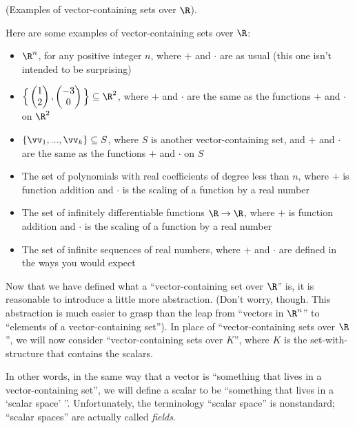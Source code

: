 \begin{remark}
    (Examples of vector-containing sets over $\R$).
    
    Here are some examples of vector-containing sets over $\R$:
    
    \begin{itemize}
        \item $\R^n$, for any positive integer $n$, where $+$ and $\cdot$ are as usual (this one isn't intended to be surprising)
        \item $\Big\{\begin{pmatrix} 1 \\ 2 \end{pmatrix}, \begin{pmatrix} -3 \\ 0 \end{pmatrix}\Big\} \subseteq \R^2$, where $+$ and $\cdot$ are the same as the functions $+$ and $\cdot$ on $\R^2$
        \item $\{\vv_1, ..., \vv_k\} \subseteq S$, where $S$ is another vector-containing set, and $+$ and $\cdot$ are the same as the functions $+$ and $\cdot$ on $S$
        \item The set of polynomials with real coefficients of degree less than $n$, where $+$ is function addition and $\cdot$ is the scaling of a function by a real number
        \item The set of infinitely differentiable functions $\R \rightarrow \R$, where $+$ is function addition and $\cdot$ is the scaling of a function by a real number
        \item The set of infinite sequences of real numbers, where $+$ and $\cdot$ are defined in the ways you would expect
    \end{itemize}
\end{remark}

Now that we have defined what a ``vector-containing set over $\R$'' is, it is reasonable to introduce a little more abstraction. (Don't worry, though. This abstraction is much easier to grasp than the leap from ``vectors in $\R^n$'' to ``elements of a vector-containing set''). In place of ``vector-containing sets over $\R$'', we will now consider ``vector-containing sets over $K$'', where $K$ is the set-with-structure that contains the scalars.

In other words, in the same way that a vector is ``something that lives in a vector-containing set'', we will define a scalar to be ``something that lives in a `scalar space' ''.  Unfortunately, the terminology ``scalar space'' is nonstandard;  ``scalar spaces'' are actually called \textit{fields}.

